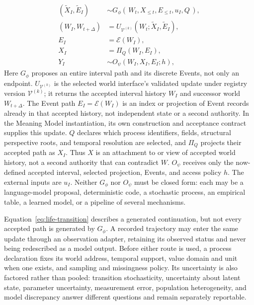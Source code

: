 \documentclass[10pt]{article}
\begin{document}
\begin{align}
  (\widetilde X_I,\widetilde E_I)
    &\sim G_{\phi}(\,W_t,X_{\leq t},E_{\leq t},u_I,Q\,),
    \label{eq:life-transition}\\
  (W_I,W_{t+\Delta})
    &=U_{\mathcal V^{(k)}}(W_t;\widetilde X_I,\widetilde E_I),
    \label{eq:world-interface-update}\\
  E_I&=\mathcal E(W_I),
    \label{eq:event-projection}\\
  X_I&=\Pi_Q(W_I,E_I),
    \label{eq:process-projection}\\
  Y_I
    &\sim O_{\psi}(W_I,X_I,E_I;h),
    \label{eq:life-observation}
\end{align}
Here $G_{\phi}$ proposes an entire interval path and its discrete Events, not
only an endpoint. $U_{\mathcal V^{(k)}}$ is the selected world interface's
validated update under registry version $\mathcal V^{(k)}$; it returns the
accepted interval history $W_I$ and successor world $W_{t+\Delta}$. The Event
path $E_I=\mathcal E(W_I)$ is an index or projection of Event records already
in that accepted history, not independent state or a second authority. In the
Meaning Model instantiation, its own construction and acceptance contract
supplies this update. $Q$ declares which process
identifiers, fields, structural perspective roots, and temporal resolution are selected, and
$\Pi_Q$ projects their accepted path as $X_I$. Thus $X$ is an attachment to or
view of accepted world history, not a second authority that can contradict
$W$. $O_{\psi}$ receives only the now-defined accepted interval, selected
projection, Events, and access policy $h$. The external inputs are
$u_I$. Neither $G_{\phi}$ nor $O_{\psi}$ must be closed form: each may be a
language-model proposal, deterministic code, a stochastic process, an
empirical table, a learned model, or a pipeline of several mechanisms.

Equation~\ref{eq:life-transition} describes a generated continuation, but not
every accepted path is generated by $G_{\phi}$. A recorded trajectory may enter
the same update through an observation adapter, retaining its observed status
and never being redescribed as a model output. Before either route is used, a
process declaration fixes its world address, temporal support, value domain and
unit when one exists, and sampling and missingness policy. Its uncertainty is
also factored rather than pooled: transition stochasticity, uncertainty about
latent state, parameter uncertainty, measurement error, population
heterogeneity, and model discrepancy answer different questions and remain
separately reportable.
\end{document}
